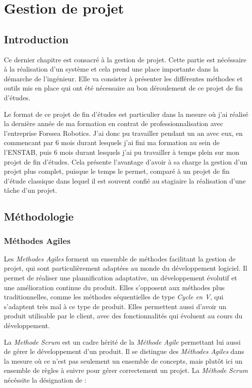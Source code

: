 \chapter{Gestion de projet}
	
	\section{Introduction}

		Ce dernier chapitre est consacré à la gestion de projet. Cette partie est nécéssaire à la réalisation d'un système et cela prend une place importante dans la démarche de l'ingénieur. Elle va consister à présenter les différentes méthodes et outils mis en place qui ont été nécessaire au bon déroulement de ce projet de fin d'études.

		Le format de ce projet de fin d'études est particulier dans la mesure où j'ai réalisé la dernière année de ma formation en contrat de professionnalisation avec l'entreprise Forssea Robotics. J'ai donc pu travailler pendant un an avec eux, en commencant par 6 mois durant lesquels j'ai fini ma formation au sein de l'\gls{ENSTAB}, puis 6 mois durant lesquels j'ai pu travailler à temps plein sur mon projet de fin d'études. Cela présente l'avantage d'avoir à sa charge la gestion d'un projet plus complet, puisque le temps le permet, comparé à un projet de fin d'étude classique dans lequel il est souvent confié au stagiaire la réalisation d'une tâche d'un projet.

	\section{Méthodologie}

		\subsection{Méthodes Agiles}
			Les \textit{Methodes Agiles} forment un ensemble de méthodes facilitant la gestion de projet, qui sont particulièrement adaptées au monde du développement logiciel. Il permet de réaliser une plannification adaptative, un développement évolutif et une amélioration continue du produit. Elles s'opposent aux méthodes plus traditionnelles, comme les méthodes séquentielles de type \textit{Cycle en V}, qui s'adaptent très mal à ce type de produit. Elles permettent aussi d'avoir un produit utilisable par le client, avec des fonctionnalités qui évoluent au cours du développement.

			La \textit{Methode Scrum} est un cadre hérité de la \textit{Méthode Agile} permettant lui aussi de gérer le développement d'un produit. Il se distingue des \textit{Méthodes Agiles} dans la mesure où ce n'est pas seulement un ensemble de concepts, mais plutôt ici un ensemble de règles à suivre pour gérer correctement un projet. La \textit{Méthode Scrum} nécéssite la désignation de :

